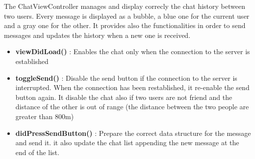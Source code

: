 The ChatViewController manages and display correcly the chat history between two users. Every message is displayed as a bubble, a blue one for the current user and a gray one for the other. It provides also the functionalities in order to send messages and updates the history when a new one is received.

\begin{itemize}

\item \textbf{viewDidLoad()} : Enables the chat only when the connection to the server is established
\item \textbf{toggleSend()} : Disable the send button if the connection to the server is interrupted. When the connection has been restablished, it re-enable the send button again. It disable the chat also if two users are not friend and the distance of the other is out of range (the distance between the two people are greater than 800m)
\item \textbf{didPressSendButton()} : Prepare the correct data structure for the message and send it. it also update the chat list appending the new message at the end of the list.
\end{itemize}

\newpage
